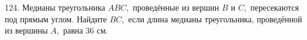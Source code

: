 124. Медианы треугольника $ABC,$ проведённые из вершин $B$ и $C,$ пересекаются под прямым углом. Найдите $BC,$ если длина медианы треугольника, проведённой из вершины $A,$ равна 36 см.\\
